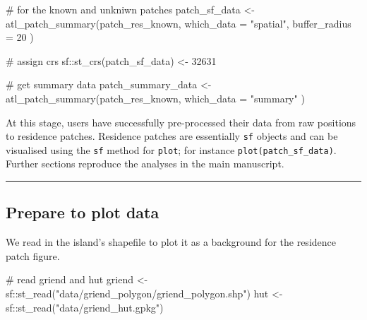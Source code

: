 \documentclass[]{scrreprt}
\newenvironment{Shaded}{}{}
\newcommand{\CommentTok}[1]{\textcolor[rgb]{0.00,0.50,0.00}{#1}}
\newcommand{\DataTypeTok}[1]{#1}
\newcommand{\DecValTok}[1]{#1}
\newcommand{\KeywordTok}[1]{\textcolor[rgb]{0.00,0.00,1.00}{#1}}
\newcommand{\NormalTok}[1]{#1}
\newcommand{\OperatorTok}[1]{#1}
\newcommand{\StringTok}[1]{\textcolor[rgb]{0.00,0.50,0.50}{#1}}
\begin{document}
\begin{Shaded}
\begin{Highlighting}[]
\CommentTok{# for the known and unkniwn patches}
\NormalTok{patch_sf_data <-}\StringTok{ }\KeywordTok{atl_patch_summary}\NormalTok{(patch_res_known,}
  \DataTypeTok{which_data =} \StringTok{"spatial"}\NormalTok{,}
  \DataTypeTok{buffer_radius =} \DecValTok{20}
\NormalTok{)}

\CommentTok{# assign crs}
\NormalTok{sf}\OperatorTok{::}\KeywordTok{st_crs}\NormalTok{(patch_sf_data) <-}\StringTok{ }\DecValTok{32631}

\CommentTok{# get summary data}
\NormalTok{patch_summary_data <-}\StringTok{ }\KeywordTok{atl_patch_summary}\NormalTok{(patch_res_known,}
  \DataTypeTok{which_data =} \StringTok{"summary"}
\NormalTok{)}
\end{Highlighting}
\end{Shaded}

At this stage, users have successfully pre-processed their data from raw positions to residence patches.
Residence patches are essentially \texttt{sf} objects and can be visualised using the \texttt{sf} method for \texttt{plot}; for instance \texttt{plot(patch\_sf\_data)}.
Further sections reproduce the analyses in the main manuscript.

\begin{center}\rule{0.5\linewidth}{0.5pt}\end{center}

\hypertarget{prepare-to-plot-data}{%
\subsection{Prepare to plot data}\label{prepare-to-plot-data}}

We read in the island's shapefile to plot it as a background for the residence patch figure.

\begin{Shaded}
\begin{Highlighting}[]
\CommentTok{# read griend and hut}
\NormalTok{griend <-}\StringTok{ }\NormalTok{sf}\OperatorTok{::}\KeywordTok{st_read}\NormalTok{(}\StringTok{"data/griend_polygon/griend_polygon.shp"}\NormalTok{)}
\NormalTok{hut <-}\StringTok{ }\NormalTok{sf}\OperatorTok{::}\KeywordTok{st_read}\NormalTok{(}\StringTok{"data/griend_hut.gpkg"}\NormalTok{)}
\end{Highlighting}
\end{Shaded}
\end{document}
